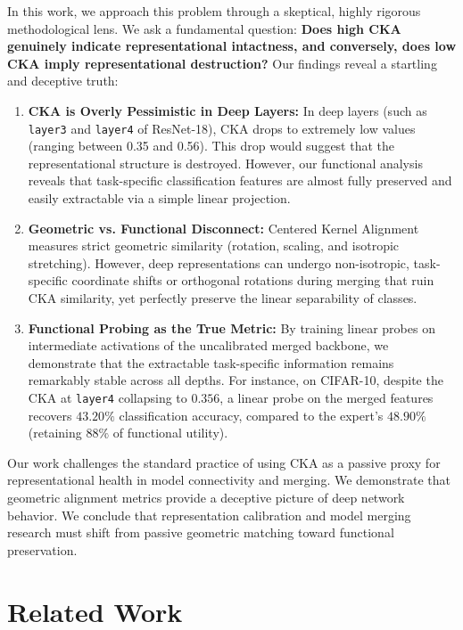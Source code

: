 \documentclass{article}
\theoremstyle{plain}
\theoremstyle{definition}
\theoremstyle{remark}
\begin{document}
In this work, we approach this problem through a skeptical, highly rigorous methodological lens. We ask a fundamental question: \textbf{Does high CKA genuinely indicate representational intactness, and conversely, does low CKA imply representational destruction?} Our findings reveal a startling and deceptive truth:
\begin{enumerate}
  \item \textbf{CKA is Overly Pessimistic in Deep Layers:} In deep layers (such as \texttt{layer3} and \texttt{layer4} of ResNet-18), CKA drops to extremely low values (ranging between 0.35 and 0.56). This drop would suggest that the representational structure is destroyed. However, our functional analysis reveals that task-specific classification features are almost fully preserved and easily extractable via a simple linear projection.
  \item \textbf{Geometric vs. Functional Disconnect:} Centered Kernel Alignment measures strict geometric similarity (rotation, scaling, and isotropic stretching). However, deep representations can undergo non-isotropic, task-specific coordinate shifts or orthogonal rotations during merging that ruin CKA similarity, yet perfectly preserve the linear separability of classes.
  \item \textbf{Functional Probing as the True Metric:} By training linear probes on intermediate activations of the uncalibrated merged backbone, we demonstrate that the extractable task-specific information remains remarkably stable across all depths. For instance, on CIFAR-10, despite the CKA at \texttt{layer4} collapsing to $0.356$, a linear probe on the merged features recovers $43.20\%$ classification accuracy, compared to the expert's $48.90\%$ (retaining $88\%$ of functional utility).
\end{enumerate}

Our work challenges the standard practice of using CKA as a passive proxy for representational health in model connectivity and merging. We demonstrate that geometric alignment metrics provide a deceptive picture of deep network behavior. We conclude that representation calibration and model merging research must shift from passive geometric matching toward functional preservation.

\vspace{-2mm}
\section{Related Work}
\label{sec:related}
\end{document}
